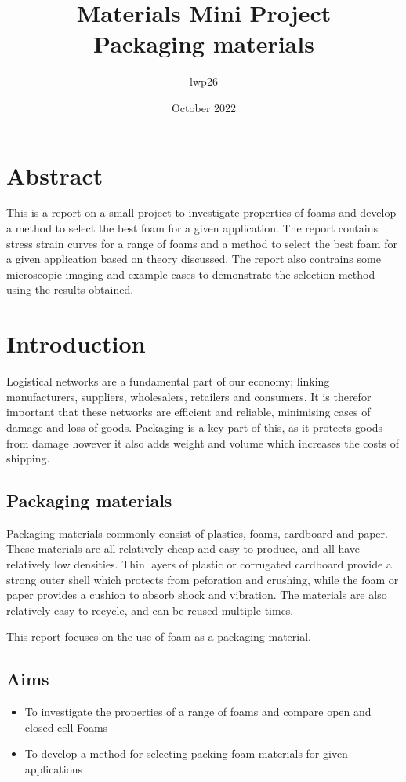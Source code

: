 \documentclass{article}
\begin{document}
\title{Materials Mini Project \\ \large{Packaging materials}}
\author{lwp26}
\date{October 2022}
\maketitle

\section{Abstract}
This is a report on a small project to investigate properties of foams and develop a method to select the best foam for a given application.
The report contains stress strain curves for a range of foams and a method to select the best foam for a given application based on theory discussed.
The report also contrains some microscopic imaging and example cases to demonstrate the selection method using the results obtained.


\section{Introduction}
Logistical networks are a fundamental part of our economy;
linking manufacturers, suppliers, wholesalers, retailers and consumers.
It is therefor important that these networks are efficient and reliable,
minimising cases of damage and loss of goods. Packaging is a key part of this,
as it protects goods from damage however it also adds weight and volume
which increases the costs of shipping.

\subsection{Packaging materials}
Packaging materials commonly consist of plastics, foams, cardboard and paper.
These materials are all relatively cheap and easy to produce, and all have relatively low densities.
Thin layers of plastic or corrugated cardboard provide a strong outer shell which
protects from peforation and crushing, while the foam or paper provides a cushion to absorb shock and vibration.
The materials are also relatively easy to recycle, and can be reused multiple times.

This report focuses on the use of foam as a packaging material.
\subsection{Aims}

\begin{itemize}
\item To investigate the properties of a range of foams and compare open and closed cell Foams
\item To develop a method for selecting packing foam materials for given applications
\end{itemize}
\end{document}
